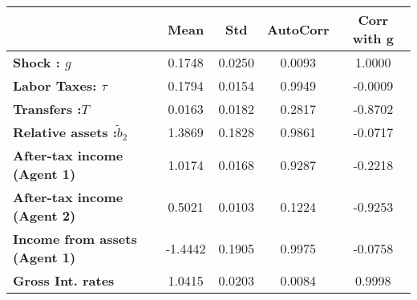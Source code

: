 \begin{tiny}\begin{tabular}{|l|c|c|c|c|}
\hline
&\textbf{Mean}&\textbf{Std}&\textbf{AutoCorr}&\textbf{Corr with g}\\\hline
\textbf{Shock : $g$}&0.1748&0.0250&0.0093&1.0000\\\hline
\textbf{Labor Taxes: $\tau$}&0.1794&0.0154&0.9949&-0.0009\\\hline
\textbf{Transfers :$T$}&0.0163&0.0182&0.2817&-0.8702\\\hline
\textbf{Relative assets  :$\tilde{b}_2$}&1.3869&0.1828&0.9861&-0.0717\\\hline
\textbf{After-tax income (Agent 1)}&1.0174&0.0168&0.9287&-0.2218\\\hline
\textbf{After-tax income (Agent 2)}&0.5021&0.0103&0.1224&-0.9253\\\hline
\textbf{Income from assets (Agent 1)}&-1.4442&0.1905&0.9975&-0.0758\\\hline
\textbf{Gross Int. rates}&1.0415&0.0203&0.0084&0.9998\\\hline
\end{tabular}
\end{tiny}